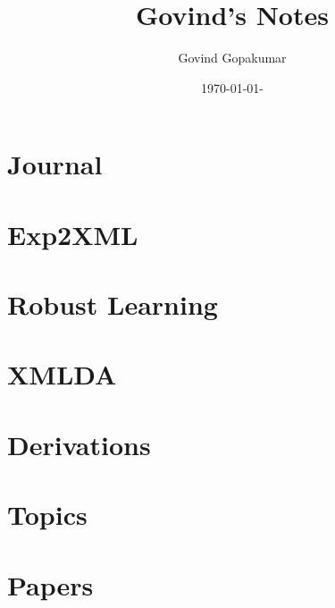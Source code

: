 \documentclass[12pt]{report}
\title{Govind's Notes}
\author{Govind Gopakumar}
\date{\today-\currenttime}
\begin{document}
\maketitle
\tableofcontents

\part{Journal}


\part{Exp2XML}


\part{Robust Learning}


\part{XMLDA}


\part{Derivations}


\part{Topics}


\part{Papers}



\clearpage
{}
\nocite{*}%
\printbibliography


%

\clearpage
\printindex
\end{document}
